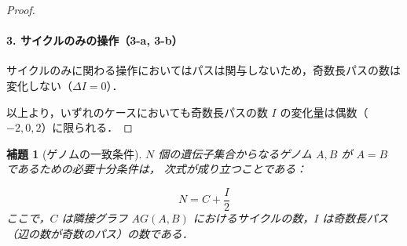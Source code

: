 \documentclass[paper=a4,fontsize=11pt,report,oneside]{jlreq}
\newtheorem{lemma}[theorem]{補題}
\begin{document}
\begin{proof}
\paragraph{3. サイクルのみの操作（3-a, 3-b）}
サイクルのみに関わる操作においてはパスは関与しないため，奇数長パスの数は変化しない（$\Delta I = 0$）．

以上より，いずれのケースにおいても奇数長パスの数 $I$ の変化量は偶数（$-2, 0, 2$）に限られる．
\end{proof}

\begin{lemma}[ゲノムの一致条件]
\label{lem:identity}
$N$ 個の遺伝子集合からなるゲノム $A, B$ が
$A=B$ であるための必要十分条件は，
次式が成り立つことである：


\begin{equation}
    N = C + \frac{I}{2}
\end{equation}
ここで，$C$ は隣接グラフ $AG(A,B)$
におけるサイクルの数，$I$ は奇数長パス
（辺の数が奇数のパス）の数である．
\end{lemma}
\end{document}
